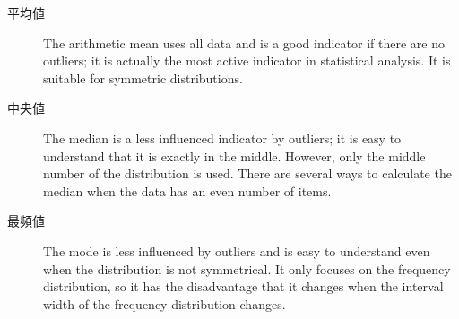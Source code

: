 \begin{description}
	\item[平均値] The arithmetic mean uses all data and is a good indicator if there are no outliers; it is actually the most active indicator in statistical analysis. It is suitable for symmetric distributions.
	\item[中央値] The median is a less influenced indicator by outliers; it is easy to understand that it is exactly in the middle. However, only the middle number of the distribution is used. There are several ways to calculate the median when the data has an even number of items.
	\item[最頻値] The mode is less influenced by outliers and is easy to understand even when the distribution is not symmetrical. It only focuses on the frequency distribution, so it has the disadvantage that it changes when the interval width of the frequency distribution changes.
\end{description}
